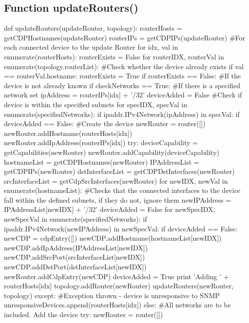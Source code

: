 \documentclass[11pt]{report}
\begin{document}
\begin{appendices}
\chapter{Function updateRouters()}
\begin{python}
def updateRouters(updateRouter, topology):
	routerHosts = getCDPHostnames(updateRouter)
	routerIPs = getCDPIPs(updateRouter)
	#For each connected device to the update Router
	for idx, val in enumerate(routerHosts):
		routerExists = False
		for routerIDX, routerVal in enumerate(topology.routerList):
			#Check whether the device already exists
			if val == routerVal.hostname:
				routerExists = True
		if routerExists == False:
			#If the device is not already known
			if checkNetworks == True:
				#If there is a specified network set
				ipAddress = routerIPs[idx] + '/32'
				deviceAdded = False
				#Check if device is within the specified subnets
				for specIDX, specVal in enumerate(specifiedNetworks):
					if ipaddr.IPv4Network(ipAddress) in specVal:
						if deviceAdded == False:
							#Create the device
							newRouter = router([])
							newRouter.addHostname(routerHosts[idx])
							newRouter.addIpAddress(routerIPs[idx])
							try:
								deviceCapability = getCapabilities(newRouter)
								newRouter.addCapability(deviceCapability)
								hostnameList = getCDPHostnames(newRouter)
								IPAddressList = getCDPIPs(newRouter)
								dstInterfaceList = getCDPDstInterfaces(newRouter)
								srcInterfaceList = getCdpSrcInterfaces(newRouter)
								for newIDX, newVal in enumerate(hostnameList):
									#Checks that the connected interfaces to the device fall within the defined subnets, if they do not, ignore them
									newIPAddress = IPAddressList[newIDX] + '/32'
									deviceAdded = False
									for newSpecIDX, newSpecVal in enumerate(specifiedNetworks):
										if ipaddr.IPv4Network(newIPAddress) in newSpecVal:
											if deviceAdded == False:
												newCDP = cdpEntry([])
												newCDP.addHostname(hostnameList[newIDX])
												newCDP.addIpAddress(IPAddressList[newIDX])
												newCDP.addSrcPort(srcInterfaceList[newIDX])
												newCDP.addDstPort(dstInterfaceList[newIDX])
												newRouter.addCdpEntry(newCDP)
												deviceAdded = True
								print 'Adding ' + routerHosts[idx]
								topology.addRouter(newRouter)
								updateRouters(newRouter, topology)
							except:
								#Exception thrown - device is unresponsive to SNMP
								unresponsiveDevices.append(routerHosts[idx])
			else:
				#All networks are to be included. Add the device
				try:
					newRouter = router([])

\end{python}
\end{appendices}
\end{document}
